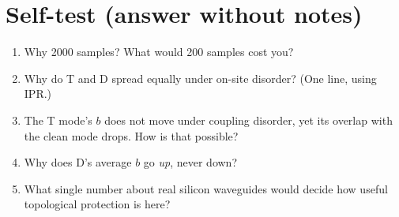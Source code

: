 \documentclass[10pt,a4paper]{article}
\begin{document}
\section{Self-test (answer without notes)}
\begin{enumerate}[itemsep=1pt]
\item Why 2000 samples? What would 200 samples cost you?
\item Why do T and D spread equally under on-site disorder? (One line, using IPR.)
\item The T mode's $b$ does not move under coupling disorder, yet its overlap with the clean mode drops. How is that possible?
\item Why does D's average $b$ go \emph{up}, never down?
\item What single number about real silicon waveguides would decide how useful topological protection is here?
\end{enumerate}
\end{document}
